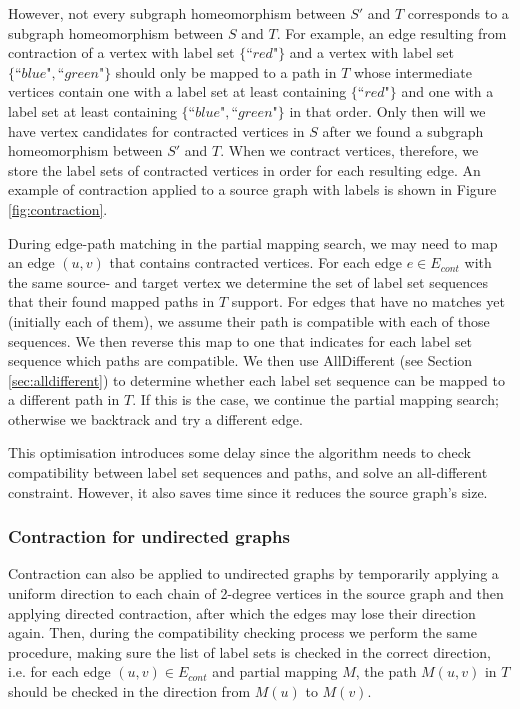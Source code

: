 However, not every subgraph homeomorphism between $S'$ and $T$ corresponds to a subgraph homeomorphism between $S$ and $T$. For example, an edge resulting from contraction of a vertex with label set $\{\text{``}\mathit{red}\text{"}\}$  and a vertex with label set  $\{\text{``}\mathit{blue}\text{"}, \text{``}\mathit{green}\text{"}\}$ should only be mapped to a path in $T$ whose intermediate vertices contain one with a label set at least containing $\{\text{``}\mathit{red}\text{"}\}$ and one with a label set at least containing  $\{\text{``}\mathit{blue}\text{"}, \text{``}\mathit{green}\text{"}\}$ in that order. Only then will we have vertex candidates for contracted vertices in $S$ after we found a subgraph homeomorphism between $S'$ and $T$. When we contract vertices, therefore, we store the label sets of contracted vertices in order for each resulting edge. An example of contraction applied to a source graph with labels is shown in Figure \ref{fig:contraction}.

During edge-path matching in the partial mapping search, we may need to map an edge $(u, v)$ that contains contracted vertices. For each 
edge $e \in E_{cont}$ with the same source- and target vertex we determine the set of label set sequences that their found mapped paths in $T$ support. For edges that have no matches yet (initially each of them), we assume their path is compatible with each of those sequences. We then reverse this map to one that indicates for each label set sequence which paths are compatible. We then use AllDifferent (see Section \ref{sec:alldifferent}) to determine whether each label set sequence can be mapped to a different path in $T$. If this is the case, we continue the partial mapping search; otherwise we backtrack and try a different edge.

This optimisation introduces some delay since the algorithm needs to check compatibility between label set sequences and paths, and solve an all-different constraint. However, it also saves time since it reduces the source graph's size.


\subsubsection{Contraction for undirected graphs}
Contraction can also be applied to undirected graphs by temporarily applying a uniform direction to each chain of 2-degree vertices in the source graph and then applying directed contraction, after which the edges may lose their direction again. Then, during the compatibility checking process we perform the same procedure, making sure the list of label sets is checked in the correct direction, i.e. for each edge $(u, v) \in E_{cont}$ and partial mapping $M$, the path $M(u, v)$ in $T$ should be checked in the direction from $M(u)$ to $M(v)$.



